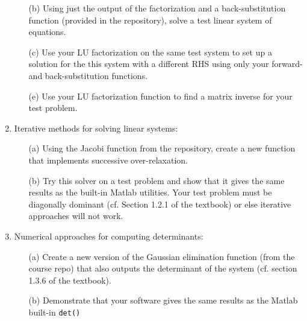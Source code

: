 \documentclass{article}
\begin{document}
\begin{enumerate}
\begin{itemize}
    \item[(b)] Using just the output of the factorization and a back-substitution function (provided in the repository), solve a test linear system of equations.  
    \item[(c)] Use your LU factorization on the same test system to set up a solution for the this system with a different RHS using only your forward- and back-substitution functions.
    \item[(e)] Use your LU factorization function to find a matrix inverse for your test problem.  
  \end{itemize}
  \item Iterative methods for solving linear systems:  
  \begin{itemize}
    \item[(a)] Using the Jacobi function from the repository, create a new function that implements successive over-relaxation.  
    \item[(b)] Try this solver on a test problem and show that it gives the same results as the built-in Matlab utilities.  Your test problem must be diagonally dominant (cf. Section 1.2.1 of the textbook) or else iterative approaches will not work.  
  \end{itemize}  
  \item Numerical approaches for computing determinants:  
  \begin{itemize}
    \item[(a)] Create a new version of the Gaussian elimination function (from the course repo) that also outputs the determinant of the system (cf. section 1.3.6 of the textbook).  
    \item[(b)] Demonstrate that your software gives the same results as the Matlab built-in \texttt{det()}
    
  \end{itemize}
\end{enumerate}
\end{document}
